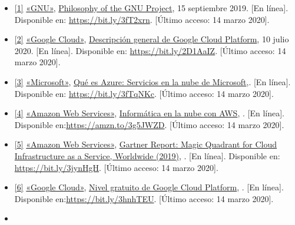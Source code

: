 \documentclass[12pt,spanish,Letterpaper,openany]{book}
\newcommand{\spacefourmilis}{\vspace{4mm}}
\begin{document}
\begin{itemize}
\item
  \hypertarget{articulo10_ref01}{}

  \protect\hyperlink{articulo10_cross01}{{[}1{]}} \href{https://www.gnu.org/}{«GNU»}, \href{https://www.gnu.org/philosophy/philosophy.html}{Philosophy of the GNU Project}, 15 septiembre 2019. {[}En línea{]}. Disponible en: \url{https://bit.ly/3fT2xrn}. {[}Último acceso: 14 marzo 2020{]}.
\item
  \hypertarget{articulo10_ref02}{}

  \protect\hyperlink{articulo10_cross02}{{[}2{]}} \href{https://cloud.google.com/}{«Google Cloud»}, \href{https://cloud.google.com/docs/overview?hl=es-419/}{Descripción general de Google Cloud Platform}, 10 julio 2020. {[}En línea{]}. Disponible en: \url{https://bit.ly/2D1AaIZ}. {[}Último acceso: 14 marzo 2020{]}.
  \spacefourmilis
\item
  \hypertarget{articulo10_ref03}{}

  \protect\hyperlink{articulo10_cross03}{{[}3{]}} \href{https://azure.microsoft.com/}{«Microsoft»}, \href{https://azure.microsoft.com/es-es/overview/what-is-azure/}{Qué es Azure: Servicios en la nube de Microsoft},. {[}En línea{]}. Disponible en: \url{https://bit.ly/3fTqNKc}. {[}Último acceso: 14 marzo 2020{]}.
  \spacefourmilis
\item
  \hypertarget{articulo10_ref04}{}

  \protect\hyperlink{articulo10_cross04}{{[}4{]}} \href{https://aws.amazon.com/}{«Amazon Web Services»}, \href{https://aws.amazon.com/es/what-is-aws/}{Informática en la nube con AWS}, . {[}En línea{]}. Disponible en:\url{https://amzn.to/3g5JWZD}. {[}Último acceso: 14 marzo 2020{]}.
  \spacefourmilis
\item
  \hypertarget{articulo10_ref05}{}

  \protect\hyperlink{articulo10_cross05}{{[}5{]}} \href{https://pages.awscloud.com/}{«Amazon Web Services»}, \href{https://pages.awscloud.com/Gartner-Magic-Quadrant-for-Infrastructure-as-a-Service-Worldwide.html}{Gartner Report: Magic Quadrant for Cloud Infrastructure as a Service, Worldwide (2019)}, . {[}En línea{]}. Disponible en: \url{https://bit.ly/3jynHgH}. {[}Último acceso: 14 marzo 2020{]}.
  \spacefourmilis
\item
  \hypertarget{articulo10_ref06}{}

  \protect\hyperlink{articulo10_cross06}{{[}6{]}} \href{https://cloud.google.com/}{«Google Cloud»}, \href{https://cloud.google.com/free/}{Nivel gratuito de Google Cloud Platform}, . {[}En línea{]}. Disponible en:\url{https://bit.ly/3hnhTEU}. {[}Último acceso: 14 marzo 2020{]}.
  \spacefourmilis
\item
  \hypertarget{articulo10_ref07}{}


\end{itemize}
\end{document}
